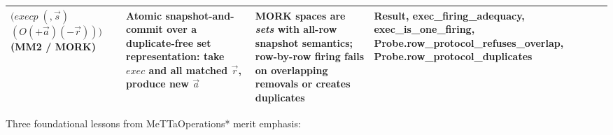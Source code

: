 \documentclass[11pt,a4paper]{article}
\theoremstyle{definition}
\DeclareRobustCommand{\lean}[1]{%
  \ifmmode\text{\normalfont\ttfamily\footnotesize\detokenize{#1}}%
  \else{\normalfont\footnotesize\leanurl{#1}}\fi}
\DeclareRobustCommand{\metta}[1]{\text{\normalfont\ttfamily\footnotesize #1}}
\def\lean#1{#1}%
\def\metta#1{#1}%
\begin{document}
\begin{table}[t]
\begin{tabular}{@{}>{\raggedright\arraybackslash}p{3.0cm}>{\raggedright\arraybackslash}p{4.1cm}>{\raggedright\arraybackslash}p{4.0cm}>{\raggedright\arraybackslash}p{3.6cm}@{}}
$\metta{(exec }\!p\;\metta{(, }\!\vec{s}\metta{)}$ \newline $\metta{(O (+ }\!\vec{a}\metta{) (- }\!\vec{r}\metta{)))}$ \newline (MM2 / MORK) & Atomic snapshot-and-commit over a duplicate-free set representation: take $\metta{exec}$ and all matched $\vec{r}$, produce new $\vec{a}$ & MORK spaces are \emph{sets} with all-row snapshot semantics; row-by-row firing fails on overlapping removals or creates duplicates & \lean{Result}, \lean{exec_firing_adequacy}, \lean{exec_is_one_firing}, \lean{Probe.row_protocol_refuses_overlap}, \lean{Probe.row_protocol_duplicates} \\
\bottomrule
\end{tabular}
\end{table}

Three foundational lessons from \lean{MeTTaOperations*} merit emphasis:
\end{document}

